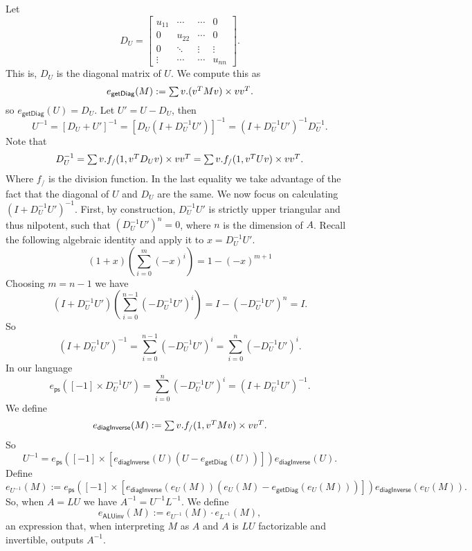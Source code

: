 Let
\[
D_U = \begin{bmatrix}
    u_{11} & \cdots & \cdots &  0 \\
    0 & u_{22} & \cdots &  0 \\
    0 & \ddots & \vdots & \vdots \\
    \vdots & \cdots& \cdots & u_{nn}
\end{bmatrix}.
\]
This is, $D_U$ is the diagonal matrix of $U$. We compute this as
$$
e_{\mathsf{getDiag}}(M) := \textstyle\sum v. (v^TMv) \times vv^T.
$$
so $e_{\mathsf{getDiag}}(U)=D_U$.
Let $U'=U-D_U$, then
$$
U^{-1}=\left[ D_U+U' \right]^{-1}= \left[ D_U\left( I+D_U^{-1}U'\right) \right]^{-1} = \left( I+D_U^{-1}U'\right)^{-1}D_U^{-1}.
$$
Note that
$$
D_U^{-1}=\textstyle\sum v. f_{/}(1,v^TD_Uv)\times vv^T=\textstyle\sum v. f_{/}(1,v^TUv)\times vv^T.
$$
Where $f_{/}$ is the division function. In the last equality we take advantage of the fact that the diagonal of $U$ and $D_U$ are the same.
We now focus on calculating $\left( I+D_U^{-1}U'\right)^{-1}$. First, by construction, $D_U^{-1}U'$ is strictly upper triangular and thus nilpotent, 
such that $\left( D_U^{-1}U'\right)^n=0$, where $n$ is the dimension of $A$.
Recall the following algebraic identity and apply it to $x=D_U^{-1}U'$. $$(1+x)\left( \sum_{i=0}^{m}(-x)^i \right)=1-(-x)^{m+1}$$
Choosing $m=n-1$ we have
$$
\left(I+D_U^{-1}U' \right)\left( \sum_{i=0}^{n-1}(-D_U^{-1}U')^i \right)=I- \left( -D_U^{-1}U'\right)^n =I.
$$
So
$$
\left(I+D_U^{-1}U' \right)^{-1}=\sum_{i=0}^{n-1}(-D_U^{-1}U')^i=\sum_{i=0}^{n}(-D_U^{-1}U')^i.
$$
In our language
$$
e_{\mathsf{ps}}([-1]\times D_U^{-1}U')=\sum_{i=0}^{n}(-D_U^{-1}U')^i=\left(I+D_U^{-1}U' \right)^{-1}.
$$
We define
$$
e_{\mathsf{diagInverse}}(M):=\textstyle\sum v. f_{/}(1,v^TMv)\times vv^T.
$$
So
$$
U^{-1}= e_{\mathsf{ps}}\left([-1]\times \left[e_{\mathsf{diagInverse}}(U)(U-e_{\mathsf{getDiag}}(U))\right] \right)e_{\mathsf{diagInverse}}(U).
$$
Define
$$
e_{U^{-1}}(M):= e_{\mathsf{ps}}\left([-1]\times \left[e_{\mathsf{diagInverse}}(e_U(M))(e_U(M)-e_{\mathsf{getDiag}}(e_U(M)))\right] \right)e_{\mathsf{diagInverse}}(e_U(M)).
$$
So, when $A=LU$ we have $A^{-1}=U^{-1}L^{-1}$. We define
$$
e_{\mathsf{ALUinv}}(M):= e_{U^{-1}}(M)\cdot e_{L^{-1}}(M),
$$
an expression that, when interpreting $M$ as $A$ and $A$ is $LU$ factorizable and invertible, outputs $A^{-1}$.

